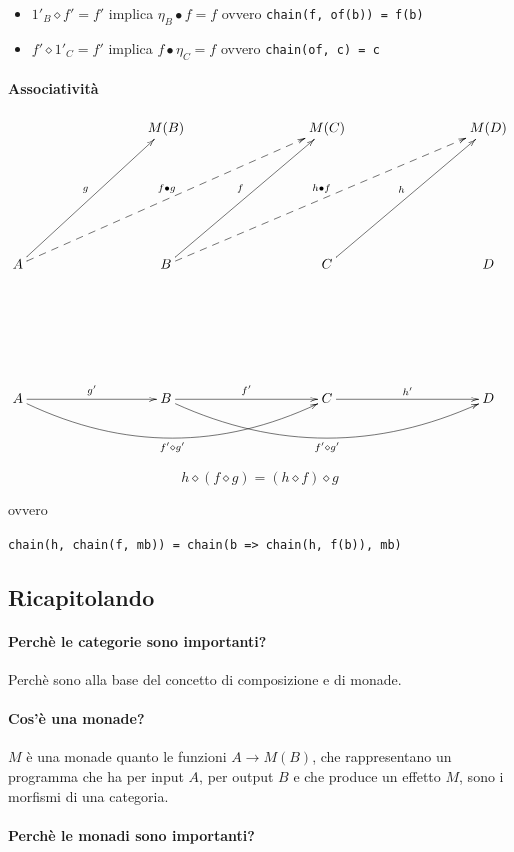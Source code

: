 \documentclass[12pt]{article}
\begin{document}
\begin{itemize}
  \item $1'_B \diamond f' = f'$ implica $\eta_B \bullet f = f$ ovvero \texttt{chain(f, of(b)) = f(b)}
  \item $f' \diamond 1'_C = f'$ implica $f \bullet \eta_C = f$ ovvero \texttt{chain(of, c) = c}
\end{itemize}

\paragraph{Associatività}

\[
\xymatrixrowsep{3cm}
\xymatrixcolsep{3cm}
\xymatrix{
  & M(B) & M(C) & M(D) \\
  A \ar[ur]^g \ar@{-->}[urr]^{f \bullet g} & B \ar[ur]^f \ar@{-->}[urr]^{h \bullet f} & C \ar[ur]^h & D \\
  A \ar[r]^{g'} \ar@/_1cm/[rr]_{f' \diamond g'} & B \ar[r]^{f'} \ar@/_1cm/[rr]_{f' \diamond g'} & C \ar[r]^{h'} & D
}
\]

$$
h \diamond (f \diamond g) = (h \diamond f) \diamond g
$$

ovvero

\begin{center}
\texttt{chain(h, chain(f, mb)) = chain(b => chain(h, f(b)), mb)}
\end{center}

\subsection{Ricapitolando}

\paragraph{Perchè le categorie sono importanti?}

Perchè sono alla base del concetto di composizione e di monade.

\paragraph{Cos'è una monade?}

$M$ è una monade quanto le funzioni $A \rightarrow M(B)$, che rappresentano un programma che ha per input $A$, per output $B$
e che produce un effetto $M$, sono i morfismi di una categoria.

\paragraph{Perchè le monadi sono importanti?}
\end{document}
